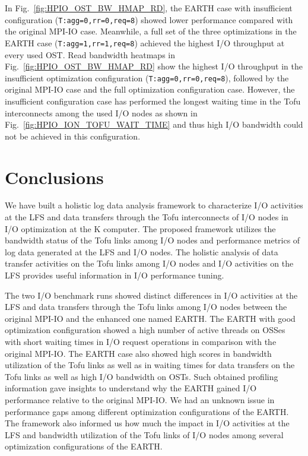 \documentclass{jhps}
\begin{document}
%
In Fig.~\ref{fig:HPIO_OST_BW_HMAP_RD}, the EARTH case with insufficient configuration
({\tt T:agg=0,rr=0,req=8}) showed lower performance compared with the original MPI-IO case.
Meanwhile, a full set of the three optimizations in the EARTH case
({\tt T:agg=1,rr=1,req=8}) achieved the highest I/O throughput at every used OST. 
Read bandwidth heatmaps in Fig.~\ref{fig:HPIO_OST_BW_HMAP_RD} show
the highest I/O throughput in the insufficient optimization configuration
({\tt T:agg=0,rr=0,req=8}), followed by the original MPI-IO case
and the full optimization configuration case.
However, the insufficient configuration case has performed the longest waiting time
in the Tofu interconnects among the used I/O nodes as shown in
Fig.~\ref{fig:HPIO_ION_TOFU_WAIT_TIME}
and thus high I/O bandwidth could not be achieved in this configuration.

\section{Conclusions}
\label{sec:CONCLUSIONS}

We have built a holistic log data analysis framework to characterize I/O activities
at the LFS and data transfers through the Tofu interconnects of I/O nodes
in I/O optimization at the K computer.
The proposed framework utilizes the bandwidth status of the Tofu links
among I/O nodes and performance metrics of log data generated at the LFS and I/O nodes.
The holistic analysis of data transfer activities on the Tofu links among I/O nodes
and I/O activities on the LFS provides useful information in I/O performance tuning.

The two I/O benchmark runs showed distinct differences in I/O activities at the LFS
and data transfers through the Tofu links among I/O nodes between the original MPI-IO
and the enhanced one named EARTH.
The EARTH with good optimization configuration showed a high number of active threads
on OSSes with short waiting times in I/O request operations in comparison
with the original MPI-IO. The EARTH case also showed high scores in bandwidth utilization
of the Tofu links as well as in waiting times for data transfers on the Tofu links
as well as high I/O bandwidth on OSTs.
Such obtained profiling information gave insights to understand
why the EARTH gained I/O performance relative to the original MPI-IO.
We had an unknown issue in performance gaps among different optimization configurations
of the EARTH.
The framework also informed us how much the impact in I/O activities at the LFS
and bandwidth utilization of the Tofu links of I/O nodes
among several optimization configurations of the EARTH.
\end{document}
